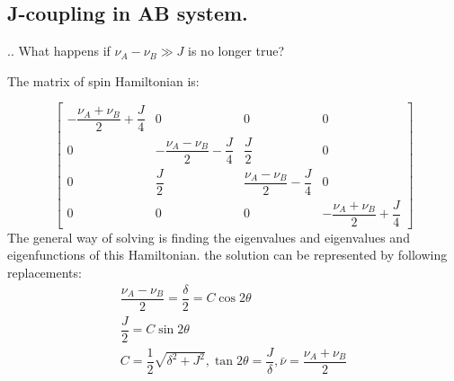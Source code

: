 \documentclass[handout]{beamer}
\begin{document}
\subsection{J-coupling in AB system.}
\begin{frame}{\thesection.\thesubsection. \insertsubsection}
	What happens if $\nu_A - \nu_B \gg J$ is no longer true?
	
		The matrix of spin Hamiltonian is:
		
			
			{\tiny
				\begin{equation}				
				\begin{bmatrix}
				-\dfrac{\nu_A+ \nu_{B}  }{2} + \dfrac{J}{4}   & 0 & 0 & 0 \\
				0 & -\dfrac{\nu_A-\nu_B}{2} - \dfrac{J}{4}  & \dfrac{J}{2} & 0 \\
				0 & \dfrac{J}{2} & \dfrac{\nu_A-\nu_B}{2} - \dfrac{J}{4}  & 0 \\
				0 & 0 & 0 & -\dfrac{\nu_A+\nu_B}{2} + \dfrac{J}{4}                  
				\end{bmatrix}
				\end{equation}
			}%
		\onslide<2-> The general way of solving is finding the eigenvalues and eigenvalues and eigenfunctions of this Hamiltonian.
		\onslide<3->
		the solution can be represented by following replacements:
		\begin{equation}
		\begin{array}{l}
		\dfrac{\nu_A - \nu_B}{2} = \dfrac{\delta}{2} = C \cos 2\theta \\
		\dfrac{J}{2} = C \sin 2\theta \\
		C = \dfrac{1}{2}\sqrt{\delta^2 + J^2}, \tan 2\theta = \dfrac{J}{\delta}, \bar{\nu} = \dfrac{\nu_A + \nu_B}{2}
		\end{array}
		\end{equation}
\end{frame}
\end{document}
